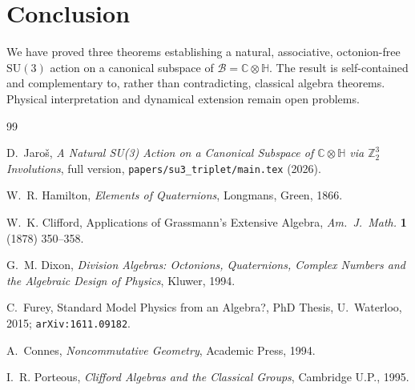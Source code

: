 \documentclass[12pt,a4paper]{article}
\theoremstyle{remark}
\begin{document}
\section{Conclusion}
\label{sec:conclusion}

We have proved three theorems establishing a natural, associative, octonion-free
$\mathrm{SU}(3)$ action on a canonical subspace of $\mathcal{B}=\mathbb{C}\otimes\mathbb{H}$.
The result is self-contained and complementary to, rather than contradicting,
classical algebra theorems.  Physical interpretation and dynamical extension
remain open problems.

\begin{thebibliography}{99}

D.~Jaro\v{s},
\emph{A Natural SU(3) Action on a Canonical Subspace of
$\mathbb{C}\otimes\mathbb{H}$ via $\mathbb{Z}_2^3$ Involutions},
full version, \texttt{papers/su3\_triplet/main.tex} (2026).

W.~R. Hamilton,
\emph{Elements of Quaternions}, Longmans, Green, 1866.

W.~K. Clifford,
Applications of Grassmann's Extensive Algebra,
\emph{Am.\ J.\ Math.} \textbf{1} (1878) 350--358.

G.~M. Dixon,
\emph{Division Algebras: Octonions, Quaternions, Complex Numbers and the
Algebraic Design of Physics}, Kluwer, 1994.

C.~Furey,
Standard Model Physics from an Algebra?,
PhD Thesis, U.~Waterloo, 2015; \texttt{arXiv:1611.09182}.

A.~Connes,
\emph{Noncommutative Geometry}, Academic Press, 1994.

I.~R. Porteous,
\emph{Clifford Algebras and the Classical Groups}, Cambridge U.P., 1995.

\end{thebibliography}
\end{document}

